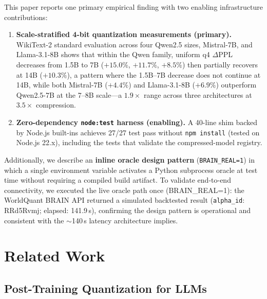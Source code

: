 \documentclass[10pt,twocolumn]{article}
\begin{document}
This paper reports one primary empirical finding with two enabling infrastructure
contributions:
\begin{enumerate}
  \item \textbf{Scale-stratified 4-bit quantization measurements (primary).}
    WikiText-2 standard evaluation across four Qwen2.5 sizes, Mistral-7B,
    and Llama-3.1-8B shows that within the Qwen family, uniform q4 $\Delta$PPL
    decreases from 1.5B to 7B ($+15.0\%$, $+11.7\%$, $+8.5\%$) then partially
    recovers at 14B ($+10.3\%$), a pattern where the 1.5B--7B decrease does not
    continue at 14B, while both Mistral-7B ($+4.4\%$) and Llama-3.1-8B ($+6.9\%$)
    outperform Qwen2.5-7B at the 7--8B scale---a $1.9\times$ range across three
    architectures at $3.5\times$ compression.
  \item \textbf{Zero-dependency \texttt{node:test} harness (enabling).}
    A 40-line shim backed by Node.js built-ins achieves 27/27 test pass
    without \texttt{npm install} (tested on Node.js 22.x), including
    the tests that validate the compressed-model registry.
\end{enumerate}

Additionally, we describe an \textbf{inline oracle design pattern}
(\texttt{BRAIN\_REAL=1}) in which a single environment variable activates a
Python subprocess oracle at test time without requiring a compiled build
artifact.  To validate end-to-end connectivity, we executed the live oracle path
once (BRAIN\_REAL=1): the WorldQuant BRAIN API returned a simulated backtested result
(\texttt{alpha\_id}: RRd5Rvmj; elapsed: 141.9\,s), confirming the design pattern
is operational and consistent with the $\sim$140\,s latency architecture implies.

\section{Related Work}
\label{sec:related}

\subsection{Post-Training Quantization for LLMs}
\label{sec:related:ptq}
\end{document}

